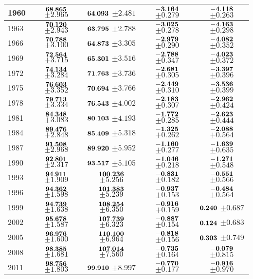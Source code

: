 \documentclass[12pt, titlepage]{article}%
\begin{document}
\begin{table}
\begin{center}
\begin{tabular}{||l||c|c||c|c||}
  1960 &  $\bf 68.865$ $\pm 2.965$& $\bf 64.093$ $\pm 2.481$& $\bf -3.164$ $\pm 0.279$& $\bf -4.118$ $\pm 0.263$ \\ \hline\hline
  1963 &  $\bf 70.120$ $\pm 2.943$& $\bf 63.795$ $\pm 2.788$& $\bf -3.025$ $\pm 0.278$& $\bf -4.163$ $\pm 0.298$ \\ \hline\hline
  1966 &  $\bf 70.788$ $\pm 3.100$& $\bf 64.873$ $\pm 3.305$& $\bf -2.979$ $\pm 0.290$& $\bf -4.082$ $\pm 0.352$ \\ \hline\hline
  1969 &  $\bf 72.564$ $\pm 3.715$& $\bf 65.301$ $\pm 3.516$& $\bf -2.788$ $\pm 0.347$& $\bf -4.023$ $\pm 0.372$ \\ \hline\hline
  1972 &  $\bf 74.134$ $\pm 3.284$& $\bf 71.763$ $\pm 3.736$& $\bf -2.681$ $\pm 0.305$& $\bf -3.397$ $\pm 0.396$ \\ \hline\hline
  1975 &  $\bf 76.603$ $\pm 3.352$& $\bf 70.694$ $\pm 3.766$& $\bf -2.449$ $\pm 0.310$& $\bf -3.536$ $\pm 0.399$ \\ \hline\hline
  1978 &  $\bf 79.713$ $\pm 3.334$& $\bf 76.543$ $\pm 4.002$& $\bf -2.183$ $\pm 0.307$& $\bf -2.962$ $\pm 0.424$ \\ \hline\hline
  1981 &  $\bf 84.348$ $\pm 3.083$& $\bf 80.103$ $\pm 4.193$& $\bf -1.772$ $\pm 0.285$& $\bf -2.623$ $\pm 0.444$ \\ \hline\hline
  1984 &  $\bf 89.476$ $\pm 2.848$& $\bf 85.409$ $\pm 5.318$& $\bf -1.325$ $\pm 0.262$& $\bf -2.088$ $\pm 0.564$ \\ \hline\hline
  1987 &  $\bf 91.508$ $\pm 2.968$& $\bf 89.920$ $\pm 5.952$& $\bf -1.160$ $\pm 0.277$& $\bf -1.639$ $\pm 0.635$ \\ \hline\hline
  1990 &  $\bf 92.801$ $\pm 2.317$& $\bf 93.517$ $\pm 5.105$& $\bf -1.046$ $\pm 0.218$& $\bf -1.271$ $\pm 0.548$ \\ \hline\hline
  1993 &  $\bf 94.911$ $\pm 1.909$& $\bf 100.236$ $\pm 5.256$& $\bf -0.831$ $\pm 0.182$& $\bf -0.551$ $\pm 0.566$ \\ \hline\hline
  1996 &  $\bf 94.362$ $\pm 1.598$& $\bf 101.383$ $\pm 5.239$& $\bf -0.937$ $\pm 0.153$& $\bf -0.484$ $\pm 0.564$ \\ \hline\hline
  1999 &  $\bf 94.739$ $\pm 1.638$& $\bf 108.254$ $\pm 6.350$& $\bf -0.916$ $\pm 0.159$& $\bf 0.240$ $\pm 0.687$ \\ \hline\hline
  2002 &  $\bf 95.678$ $\pm 1.587$& $\bf 107.739$ $\pm 6.323$& $\bf -0.887$ $\pm 0.154$& $\bf 0.124$ $\pm 0.683$ \\ \hline\hline
  2005 &  $\bf 96.976$ $\pm 1.600$& $\bf 110.100$ $\pm 6.964$& $\bf -0.818$ $\pm 0.156$& $\bf 0.303$ $\pm 0.749$ \\ \hline\hline
  2008 &  $\bf 98.385$ $\pm 1.681$& $\bf 107.014$ $\pm 7.560$& $\bf -0.735$ $\pm 0.164$& $\bf -0.079$ $\pm 0.815$ \\ \hline\hline
  2011 &  $\bf 98.756$ $\pm 1.803$& $\bf 99.910$ $\pm 8.997$& $\bf -0.770$ $\pm 0.177$& $\bf -0.916$ $\pm 0.970$ \\ \hline\hline
  

\end{tabular}
\end{center}
\end{table}
\end{document}
